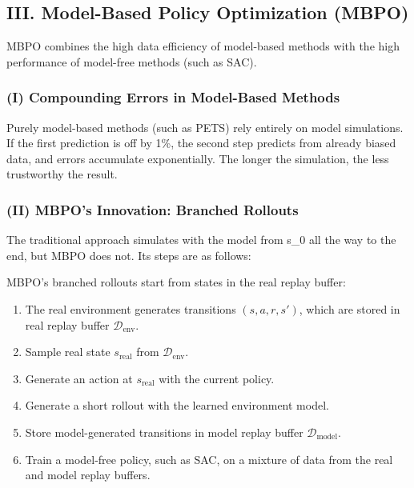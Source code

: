 \hypertarget{iii.-model-based-policy-optimization-mbpo}{%
\subsection{III. Model-Based Policy Optimization (MBPO)}\label{iii.-model-based-policy-optimization-mbpo}}

MBPO combines the high data efficiency of model-based methods with the high performance of model-free methods (such as SAC).

\hypertarget{i-compounding-errors-in-model-based-methods}{%
\subsubsection{(I) Compounding Errors in Model-Based Methods}\label{i-compounding-errors-in-model-based-methods}}

Purely model-based methods (such as PETS) rely entirely on model simulations. If the first prediction is off by 1\%, the second step predicts from already biased data, and errors accumulate exponentially. The longer the simulation, the less trustworthy the result.

\hypertarget{ii-mbpos-innovation-branched-rollouts}{%
\subsubsection{(II) MBPO's Innovation: Branched Rollouts}\label{ii-mbpos-innovation-branched-rollouts}}

The traditional approach simulates with the model from s\_0 all the way to the end, but MBPO does not. Its steps are as follows:

MBPO's branched rollouts start from states in the real replay buffer:

\begin{enumerate}
\def\labelenumi{\arabic{enumi}.}
\tightlist
\item
  The real environment generates transitions \((s,a,r,s')\), which are stored in real replay buffer \(\mathcal D_{\mathrm{env}}\).
\item
  Sample real state \(s_{\mathrm{real}}\) from \(\mathcal D_{\mathrm{env}}\).
\item
  Generate an action at \(s_{\mathrm{real}}\) with the current policy.
\item
  Generate a short rollout with the learned environment model.
\item
  Store model-generated transitions in model replay buffer \(\mathcal D_{\mathrm{model}}\).
\item
  Train a model-free policy, such as SAC, on a mixture of data from the real and model replay buffers.
\end{enumerate}

